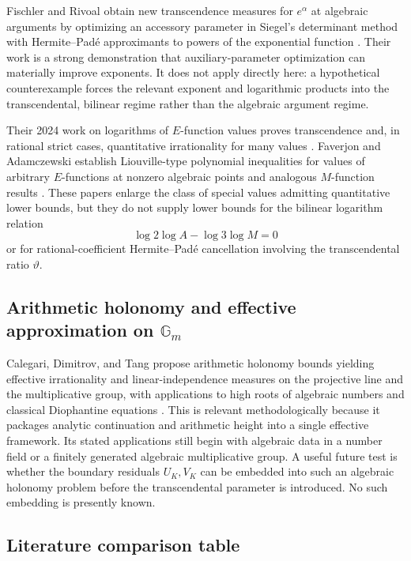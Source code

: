 \documentclass[11pt,oneside]{article}
\theoremstyle{definition}
\theoremstyle{remark}
\newcommand{\thetaq}{\vartheta}
\begin{document}
Fischler and Rivoal obtain new transcendence measures for \(e^\alpha\) at algebraic arguments
by optimizing an accessory parameter in Siegel's determinant method with Hermite--Pad\'e
approximants to powers of the exponential function \cite{FischlerRivoalExp}.  Their work is a
strong demonstration that auxiliary-parameter optimization can materially improve exponents.
It does not apply directly here: a hypothetical counterexample forces the relevant exponent
and logarithmic products into the transcendental, bilinear regime rather than the algebraic
argument regime.

Their 2024 work on logarithms of \(E\)-function values proves transcendence and, in rational
strict cases, quantitative irrationality for many values \cite{FischlerRivoalLogE}.  Faverjon
and Adamczewski establish Liouville-type polynomial inequalities for values of arbitrary
\(E\)-functions at nonzero algebraic points and analogous \(M\)-function results
\cite{FaverjonAdamczewski}.  These papers enlarge the class of special values admitting
quantitative lower bounds, but they do not supply lower bounds for the bilinear logarithm
relation
\[
 \log2\log A-\log3\log M=0
\]
or for rational-coefficient Hermite--Pad\'e cancellation involving the transcendental ratio
\(\thetaq\).

\subsection{Arithmetic holonomy and effective approximation on \texorpdfstring{\(\mathbb G_m\)}{Gm}}

Calegari, Dimitrov, and Tang propose arithmetic holonomy bounds yielding effective irrationality
and linear-independence measures on the projective line and the multiplicative group, with
applications to high roots of algebraic numbers and classical Diophantine equations
\cite{CalegariDimitrovTang}.  This is relevant methodologically because it packages analytic
continuation and arithmetic height into a single effective framework.  Its stated applications
still begin with algebraic data in a number field or a finitely generated algebraic
multiplicative group.  A useful future test is whether the boundary residuals
\(U_K,V_K\) can be embedded into such an algebraic holonomy problem before the transcendental
parameter is introduced.  No such embedding is presently known.

\subsection{Literature comparison table}
\end{document}
